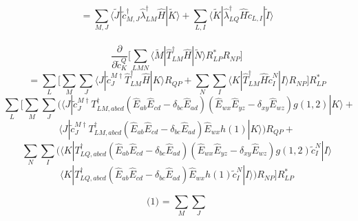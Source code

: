 \documentclass[12pt]{article}
\begin{document}
\begin{equation}
=\sum_{M,J}\langle\tilde{J}|\tilde{c}_{M,J}^{\dagger}\hat{\lambda}_{LM}^{\dagger}\hat{H}|\tilde{K}\rangle 
+\sum_{L,I}\langle\tilde{K}|\hat{\lambda}_{LQ}^{\dagger}\hat{H}\tilde{c}_{L,I}|\tilde{I}\rangle 
\end{equation}
\\
















\begin{equation*}
\frac{\partial}{\partial \tilde{c}^{Q}_{K}}\Bigg[ \sum_{LMN}\langle \tilde{M}|\hat{T}_{LM}^{\dagger}\hat{H}|\tilde{N}\rangle R_{LP}^{*}R_{NP}\Bigg] 
\end{equation*}
\begin{equation*}
=\sum_{L} \Bigg[
\sum_{M}\sum_{J} \langle J |\tilde{c}^{M\dagger}_{J}\hat{T}_{LM}^{\dagger}\hat{H}|K\rangle R_{QP}+
\sum_{N}\sum_{I} \langle K |\hat{T}_{LM}^{\dagger}\hat{H}\tilde{c}^{N}_{I}|I\rangle R_{NP}\Bigg]R^{*}_{LP}
\end{equation*}
\begin{equation}
\sum_{L} \Bigg[
\sum_{M}\sum_{J} 
\Big(\langle J |\tilde{c}^{M\dagger}_{J} T_{LM,abcd}^{\dagger}(\hat{E}_{ab}\hat{E}_{cd}-\delta_{bc}\hat{E}_{ad})(\hat{E}_{wx}\hat{E}_{yz}-\delta_{xy}\hat{E}_{wz})g(1,2)|K\rangle+
\end{equation}
\begin{equation}
\langle J |\tilde{c}^{M\dagger}_{J} T_{LM,abcd}^{\dagger}(\hat{E}_{ab}\hat{E}_{cd}-\delta_{bc}\hat{E}_{ad})\hat{E}_{wx}h(1)|K\rangle\Big) R_{QP}+
\end{equation}
\begin{equation}
\sum_{N}\sum_{I} \Big(
\langle K | T_{LQ,abcd}^{\dagger}(\hat{E}_{ab}\hat{E}_{cd}-\delta_{bc}\hat{E}_{ad})(\hat{E}_{wx}\hat{E}_{yz}-\delta_{xy}\hat{E}_{wz})g(1,2)\tilde{c}^{N}_{I}|I\rangle 
\end{equation}
\begin{equation}
\langle K | T_{LQ,abcd}^{\dagger}(\hat{E}_{ab}\hat{E}_{cd}-\delta_{bc}\hat{E}_{ad})\hat{E}_{wx}h(1)\tilde{c}^{N}_{I}|I\rangle\Big) R_{NP}\Bigg]R^{*}_{LP}
\end{equation}


\begin{equation*}
\text{(1) = }  \sum_{M}\sum_{J} 
\end{equation*}
\end{document}
